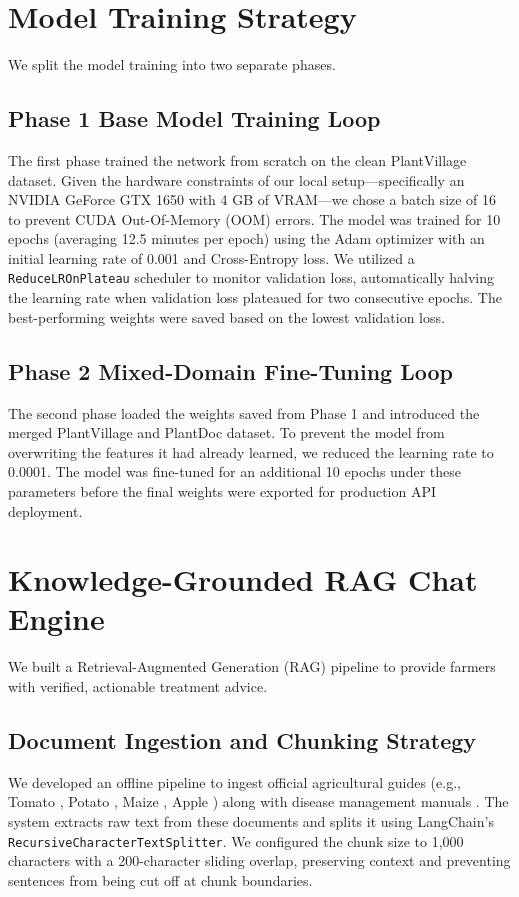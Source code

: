 \documentclass[12pt, a4paper]{report}
\begin{document}
\section{Model Training Strategy}
We split the model training into two separate phases.

\subsection{Phase 1 Base Model Training Loop}
The first phase trained the network from scratch on the clean PlantVillage dataset. Given the hardware constraints of our local setup—specifically an NVIDIA GeForce GTX 1650 with 4 GB of VRAM—we chose a batch size of 16 to prevent CUDA Out-Of-Memory (OOM) errors. The model was trained for 10 epochs (averaging 12.5 minutes per epoch) using the Adam optimizer with an initial learning rate of 0.001 and Cross-Entropy loss. We utilized a \texttt{ReduceLROnPlateau} scheduler to monitor validation loss, automatically halving the learning rate when validation loss plateaued for two consecutive epochs. The best-performing weights were saved based on the lowest validation loss.

\subsection{Phase 2 Mixed-Domain Fine-Tuning Loop}
The second phase loaded the weights saved from Phase 1 and introduced the merged PlantVillage and PlantDoc dataset. To prevent the model from overwriting the features it had already learned, we reduced the learning rate to 0.0001. The model was fine-tuned for an additional 10 epochs under these parameters before the final weights were exported for production API deployment.

\section{Knowledge-Grounded RAG Chat Engine}
We built a Retrieval-Augmented Generation (RAG) pipeline to provide farmers with verified, actionable treatment advice.

\subsection{Document Ingestion and Chunking Strategy}
We developed an offline pipeline to ingest official agricultural guides (e.g., Tomato \cite{nhb_tomato}, Potato \cite{nhb_potato}, Maize \cite{seedco_maize}, Apple \cite{vikaspedia_apple}) along with disease management manuals \cite{idm_concept}. The system extracts raw text from these documents and splits it using LangChain's \texttt{RecursiveCharacterTextSplitter}. We configured the chunk size to 1,000 characters with a 200-character sliding overlap, preserving context and preventing sentences from being cut off at chunk boundaries.
\end{document}
